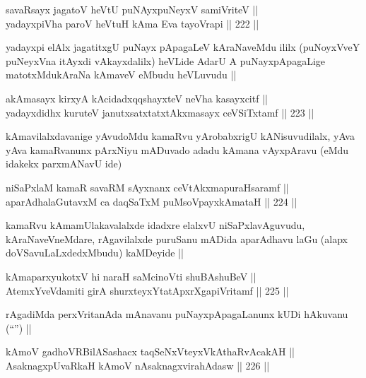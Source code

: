 \begin{shl}
savaRsayx jagatoV heVtU puNAyxpuNeyxV samiVriteV || \\
yadayxpiVha paroV heVtuH kAma Eva tayoVrapi ||  222 ||  
\end{shl}

\begin{artha}
yadayxpi elAlx jagatitxgU puNayx pApagaLeV kAraNaveMdu ililx
(puNoyxVveY puNeyxVna itAyxdi vAkayxdalilx) heVLide AdarU A
puNayxpApagaLige matotxMdukAraNa kAmaveV eMbudu heVLuvudu ||
\end{artha}

\begin{shl}
akAmasayx kirxyA kAcidadxqqshayxteV neVha kasayxcitf || \\
yadayxdidhx kuruteV janutxsatxtatxtAkxmasayx ceVSiTxtamf ||  223 ||  
\end{shl}

\begin{artha}
kAmavilalxdavanige yAvudoMdu kamaRvu yArobabxrigU kANisuvudilalx, yAva
yAva kamaRvanunx pArxNiyu mADuvado adadu kAmana vAyxpAravu (eMdu
idakekx parxmANavU ide)
\end{artha}

\begin{shl}
niSaPxlaM kamaR savaRM sAyxnanx ceVtAkxmapuraHsaramf || \\
aparAdhalaGutavxM ca daqSaTxM puMsoV\s payxkAmataH ||  224 ||  
\end{shl}

\begin{artha}
kamaRvu kAma\s mUlakavalalxde idadxre elalxvU niSaPxlavAguvudu,
kAraNaveVneMdare, rAgavilalxde puruSanu mADida aparAdhavu laGu (alapx
doVSavuLaLxdedxMbudu) kaMDeyide ||
\end{artha}

\begin{shl}
kAmaparxyukotxV hi naraH saMcinoVti shuBAshuBeV || \\
AtemxYveVdamiti girA shurxteyxYtatApxrXgapiVritamf ||  225 ||  
\end{shl}

\begin{artha}
rAgadiMda perxVritanAda mAnavanu puNayxpApagaLanunx kUDi hAkuvanu
(``\stext'') ||
\end{artha}


\begin{shl}
kAmoV gadhoVR\s BilASashacx taqSeNxVteyxVkAthaRvAcakAH || \\
AsaknagxpUvaRkaH kAmoV nA\s \s saknagxvirahAdasw ||  226 ||  
\end{shl}	

